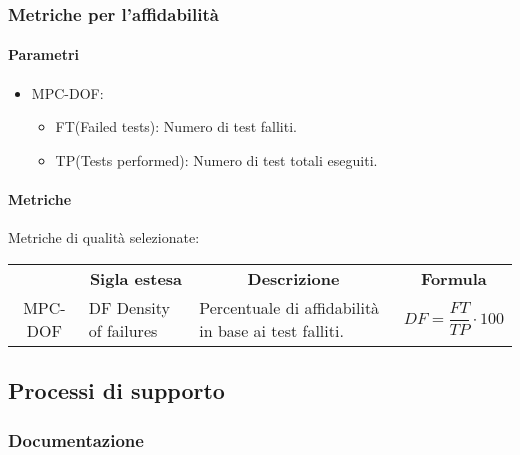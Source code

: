 \subsubsection{Metriche per l'affidabilità }
\paragraph{Parametri}
\begin{itemize}
    \item MPC-DOF:
          \begin{itemize}
              \item FT(Failed tests):  Numero di test falliti.
              \item TP(Tests performed):  Numero di test totali eseguiti.
          \end{itemize}
\end{itemize}
\paragraph{Metriche}
Metriche di qualità selezionate:
\begin{table}[H]
    \centering
    \renewcommand{\arraystretch}{1.8}
    \begin{tabular}{| c | p{4.2cm} | p{5cm} | p{2cm} |  }
        \rowcolor[HTML]{a52a2a}
        \multicolumn{1}{c}{\color[HTML]{FFFFFF} \textbf{Codice}}       &
        \multicolumn{1}{c}{\color[HTML]{FFFFFF} \textbf{Sigla estesa}} &
        \multicolumn{1}{c}{\color[HTML]{FFFFFF} \textbf{Descrizione}}  &
        \multicolumn{1}{c}{\color[HTML]{FFFFFF} \textbf{Formula}}                                                                                                                                                   \\
        MPC-DOF                                                        & DF Density of failures & Percentuale di affidabilità in base ai test falliti. & \begin{equation}DF = \frac{FT}{TP} \cdot 100\end{equation} \\
        \hline
    \end{tabular}
\end{table}
\subsection{Processi di supporto}
\subsubsection{Documentazione}
